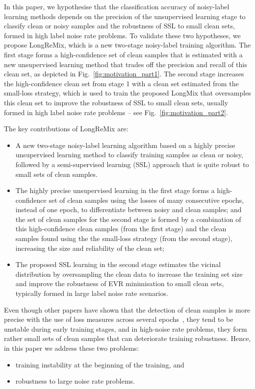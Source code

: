 \documentclass[review]{elsarticle}
\begin{document}
In this paper, we hypothesise that the classification accuracy of noisy-label learning methods depends on the precision of the unsupervised learning stage to classify clean or noisy samples and the robustness of SSL to small clean sets, formed in high label noise rate problems. 
To validate these two hypotheses, we propose LongReMix, which is a new two-stage noisy-label training algorithm. The first stage forms a high-confidence set  
of clean samples that is estimated with a new unsupervised learning method that trades off the precision and recall of this clean set, as depicted in 
Fig.~\ref{fig:motivation_part1}. 
The second stage increases the high-confidence clean set from stage 1 with a clean set estimated from the small-loss strategy, which is used to train the proposed LongMix that oversamples this clean set to improve the robustness of SSL to small clean sets, usually formed in high label noise rate problems -- see Fig.~\ref{fig:motivation_part2}.


The key contributions of LongReMix are:
\begin{itemize}
  \item A new two-stage noisy-label learning algorithm based on a highly precise unsupervised learning method to classify training samples as clean or noisy, followed by a semi-supervised learning (SSL) approach that is quite robust to small sets of clean samples.
  \item The highly precise unsupervised learning in the first stage forms a high-confidence set of clean samples using the losses of many consecutive epochs, instead of one epoch, to differentiate between noisy and clean samples; and the set of clean samples for the second stage is formed by a combination of this high-confidence clean samples (from the first stage) and the clean samples found using the the small-loss strategy (from the second stage), increasing the size and reliability of the clean set;
  \item The proposed SSL learning in the second stage estimates the vicinal distribution 
  by oversampling the clean data to increase the training set size and improve
  the robustness of EVR minimisation to small clean sets, typically formed in large label noise rate scenarios.
\end{itemize}
Even though other papers have shown that the detection of clean samples is more precise with the use of loss measures across several epochs~\cite{relab,area_under_margin,toneva2018empirical}, they tend to be unstable during early training stages, and in high-noise rate problems, they form rather small sets of clean samples that can deteriorate training robustness.
Hence, in this paper we address these two problems:
\begin{itemize}
    \item training instability at the beginning of the training, and
    \item robustness to large noise rate problems.
\end{itemize}
\end{document}
